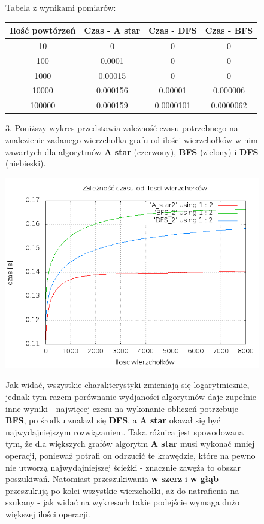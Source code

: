 \documentclass[a4paper,11pt]{report}
\begin{document}
\begin{figure}
  \begin{center}
  Tabela z wynikami pomiarów:\\
  \begin{tabular}{|c|c|c|c|}
  \hline 
  Ilość powtórzeń & Czas - A star & Czas - DFS & Czas - BFS\\
  \hline
  10 & 0 & 0 & 0\\
  \hline
  100 & 0.0001 & 0 & 0\\
  \hline
  1000	&	0.00015 & 0 & 0\\
  \hline
  10000	&	0.000156 & 0.00001 & 0.000006\\
  \hline
  100000 &	0.000159 & 0.0000101 & 0.0000062\\
  \hline
\end{tabular}
\end{center}
\end{figure}
\begin{figure}
  3. Poniższy wykres przedstawia zależność czasu potrzebnego na znalezienie zadanego wierzchołka grafu od ilości wierzchołków w nim zawartych dla algorytmów \textbf{A star} (czerwony), \textbf{BFS} (zielony) i \textbf{DFS} (niebieski).
  \\\begin{center} \includegraphics[scale=0.55]{./razem_2.png}\end{center}
  Jak widać, wszystkie charakterystyki zmieniają się logarytmicznie, jednak tym razem porównanie wydjaności algorytmów daje zupełnie inne wyniki - najwięcej czesu na wykonanie obliczeń potrzebuje \textbf{BFS}, po środku znalazł się \textbf{DFS}, a \textbf{A star} okazał się być najwydajniejszym rozwiązaniem. Taka różnica jest spowodowana tym, że dla większych grafów algorytm \textbf{A star} musi wykonać mniej operacji, ponieważ potrafi on odrzucić te krawędzie, które na pewno nie utworzą najwydajniejszej ścieżki - znacznie zawęża to obszar poszukiwań. Natomiast przeszukiwania \textbf{w szerz} i \textbf{w głąb} przeszukują po kolei wszystkie wierzchołki, aż do natrafienia na szukany - jak widać na wykresach takie podejście wymaga dużo większej ilości operacji. 
\end{figure}
\end{document}
